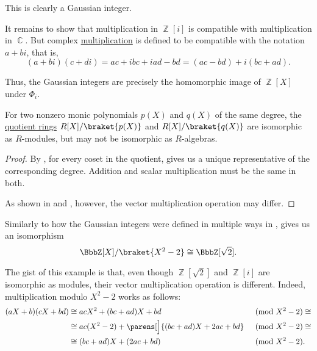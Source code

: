 \begin{example}
\begin{thmenum}
    This is clearly a Gaussian integer.

    It remains to show that multiplication in \( \BbbZ[i] \) is compatible with multiplication in \( \BbbC \). But complex \hyperref[def:set_of_complex_numbers]{multiplication} is defined to be compatible with the notation \( a + bi \), that is,
    \begin{equation*}
    (a + bi) (c + di)
    =
    ac + ibc + iad - bd
    =
    (ac - bd) + i(bc + ad).
    \end{equation*}

    Thus, the Gaussian integers are precisely the homomorphic image of \( \BbbZ[X] \) under \( \Phi_i \).
  \end{thmenum}
\end{example}

\begin{corollary}\label{thm:polynomial_quotient_modules_vs_algebras}
  For two nonzero monic polynomials \( p(X) \) and \( q(X) \) of the same degree, the \hyperref[def:ring/quotient]{quotient rings} \( R[X] / \braket{ p(X) } \) and \( R[X] / \braket{ q(X) } \) are isomorphic as \( R \)-modules, but may not be isomorphic as \( R \)-algebras.
\end{corollary}
\begin{proof}
  By , for every coset in the quotient,  gives us a unique representative of the corresponding degree. Addition and scalar multiplication must be the same in both.

  As shown in  and , however, the vector multiplication operation may differ.
\end{proof}

\begin{example}\label{ex:integers_with_sqrt2}
  Similarly to how the Gaussian integers were defined in multiple ways in ,  gives us an isomorphism
  \begin{equation*}
    \BbbZ[X] / \braket{X^2 - 2} \cong \BbbZ[\sqrt 2].
  \end{equation*}

  The gist of this example is that, even though \( \BbbZ[\sqrt 2] \) and \( \BbbZ[i] \) are isomorphic as modules, their vector multiplication operation is different. Indeed, multiplication modulo \( X^2 - 2 \) works as follows:
  \begin{align*}
    (aX + b) (cX + bd)
    &\cong
    acX^2 + (bc + ad)X + bd
    &\pmod {X^2 - 2} \cong \\ &\cong
    ac(X^2 - 2) + \parens[\Big]{ (bc + ad)X + 2ac + bd }
    &\pmod {X^2 - 2} \cong \\ &\cong
    (bc + ad)X + (2ac + bd)
    &\pmod {X^2 - 2}. \phantom{\cong}
  \end{align*}
\end{example}

